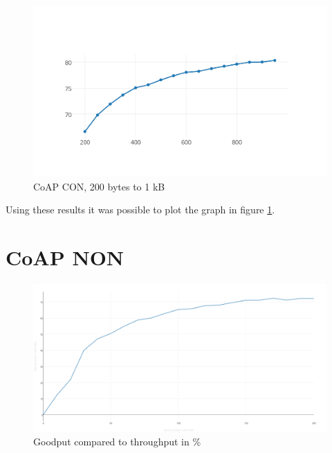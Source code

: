 \begin{figure}[ht]
    \centering
    \includegraphics[width=\textwidth]{plotCoAPCON200-k.png}    
    \caption{CoAP CON, 200 bytes to 1 kB}
    \label{fig:plotCoAPCON200toK}
\end{figure}

Using these results it was possible to plot the graph in figure \ref{fig:plotCoAPCON200toK}. 


\section{CoAP NON}


\begin{figure}[ht]
    \centering
    \includegraphics[scale=0.25]{graph1.png}    
    \caption{Goodput compared to throughput in \%}
    \label{fig:goodputThroughputGraph}
\end{figure}



